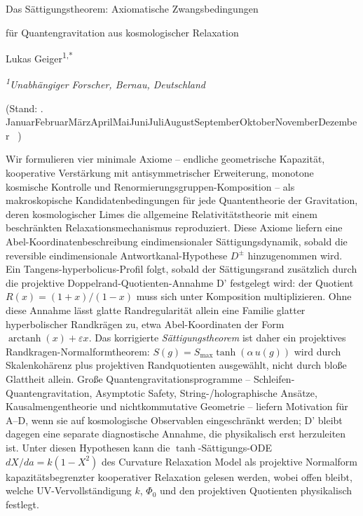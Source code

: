 \documentclass[aps,prd,twocolumn,superscriptaddress,nofootinbib]{revtex4-2}
\newcommand{\germanmonthname}{%
  \ifcase\month\or Januar\or Februar\or März\or April\or Mai\or Juni\or Juli\or August\or September\or Oktober\or November\or Dezember\fi%
}
\newcommand{\germantoday}{\number\day.~\germanmonthname~\number\year}
\begin{document}
\onecolumngrid


\thispagestyle{empty}
\vspace*{0.08\textheight}

\begin{center}
{\LARGE Das Sättigungstheorem: Axiomatische Zwangsbedingungen\par}
\vspace{0.2em}
{\LARGE für Quantengravitation aus kosmologischer Relaxation\par}
\vspace{1.8em}
{\large Lukas Geiger\textsuperscript{1,*}\par}
\vspace{0.6em}
{\itshape \textsuperscript{1}Unabhängiger Forscher, Bernau, Deutschland\textsuperscript{\textdagger}\par}
\vspace{0.2em}
{(Stand: \germantoday)\par}
\end{center}

\vspace{1.8em}
\noindent
Wir formulieren vier minimale Axiome -- endliche geometrische Kapazität, kooperative Verstärkung mit antisymmetrischer Erweiterung, monotone kosmische Kontrolle und Renormierungsgruppen-Komposition -- als makroskopische Kandidatenbedingungen für jede Quantentheorie der Gravitation, deren kosmologischer Limes die allgemeine Relativitätstheorie mit einem beschränkten Relaxationsmechanismus reproduziert. Diese Axiome liefern eine Abel-Koordinatenbeschreibung eindimensionaler Sättigungsdynamik, sobald die reversible eindimensionale Antwortkanal-Hypothese $D^\pm$ hinzugenommen wird. Ein Tangens-hyperbolicus-Profil folgt, sobald der Sättigungsrand zusätzlich durch die projektive Doppelrand-Quotienten-Annahme D' festgelegt wird: der Quotient $R(x)=(1+x)/(1-x)$ muss sich unter Komposition multiplizieren. Ohne diese Annahme lässt glatte Randregularität allein eine Familie glatter hyperbolischer Randkrägen zu, etwa Abel-Koordinaten der Form $\operatorname{arctanh}(x)+\varepsilon x$. Das korrigierte \textit{Sättigungstheorem} ist daher ein projektives Randkragen-Normalformtheorem: $S(g)=S_{\max}\tanh(\alpha\,u(g))$ wird durch Skalenkohärenz plus projektiven Randquotienten ausgewählt, nicht durch bloße Glattheit allein. Große Quantengravitationsprogramme -- Schleifen-Quantengravitation, Asymptotic Safety, String-/holographische Ansätze, Kausalmengentheorie und nichtkommutative Geometrie -- liefern Motivation für A--D, wenn sie auf kosmologische Observablen eingeschränkt werden; D' bleibt dagegen eine separate diagnostische Annahme, die physikalisch erst herzuleiten ist. Unter diesen Hypothesen kann die $\tanh$-Sättigungs-ODE $dX/da = k(1-X^2)$ des Curvature Relaxation Model als projektive Normalform kapazitätsbegrenzter kooperativer Relaxation gelesen werden, wobei offen bleibt, welche UV-Vervollständigung $k$, $\Phi_0$ und den projektiven Quotienten physikalisch festlegt.
\end{document}
